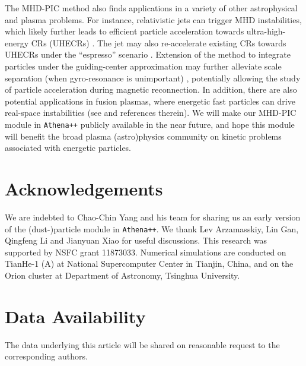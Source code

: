 \documentclass[fleqn,usenatbib]{mnras}
\begin{document}
The MHD-PIC method also finds applications in a variety of other astrophysical and plasma problems. For instance,
relativistic jets can trigger
MHD instabilities, which likely further leads to efficient particle acceleration towards ultra-high-energy CRs (UHECRs) \citep{2018PhRvL.121x5101A, 2020ApJ...896L..31D, 2022ApJ...931..137O, 2020arXiv200904158M, 2021ApJ...907L..44S, 2022ApJ...928...62K}. The jet may also re-accelerate existing CRs towards UHECRs under the ``espresso'' scenario \citep{2019ApJ...886....8M, 2021ApJ...921...85M}.
Extension of the method to integrate particles under the guiding-center approximation may further alleviate scale separation (when gyro-resonance is unimportant) \citep{2019PhPl...26j2903A, 2023CoPhC.28508625M}, 
potentially allowing the study of particle acceleration during magnetic reconnection.
In addition, there are also potential applications in fusion plasmas, where energetic fast particles can drive real-space instabilities (see \citealp{2016RvMP...88a5008C} and references therein).
We will make our MHD-PIC module in \texttt{Athena++} publicly available in the near future, and hope this module will benefit the broad plasma (astro)physics community on kinetic problems associated with energetic particles.


\section*{Acknowledgements}
We are indebted to Chao-Chin Yang and his team for sharing us an early version of the (dust-)particle module in \texttt{Athena++}. We thank Lev Arzamasskiy, Lin Gan, Qingfeng Li and Jianyuan Xiao for useful discussions. This research was supported by NSFC grant 11873033. Numerical simulations are conducted on TianHe-1 (A) at National Supercomputer Center in Tianjin, China, and on the Orion cluster at Department of Astronomy, Tsinghua University.

\section*{Data Availability}

The data underlying this article will be shared on reasonable request to the corresponding authors.




\end{document}

